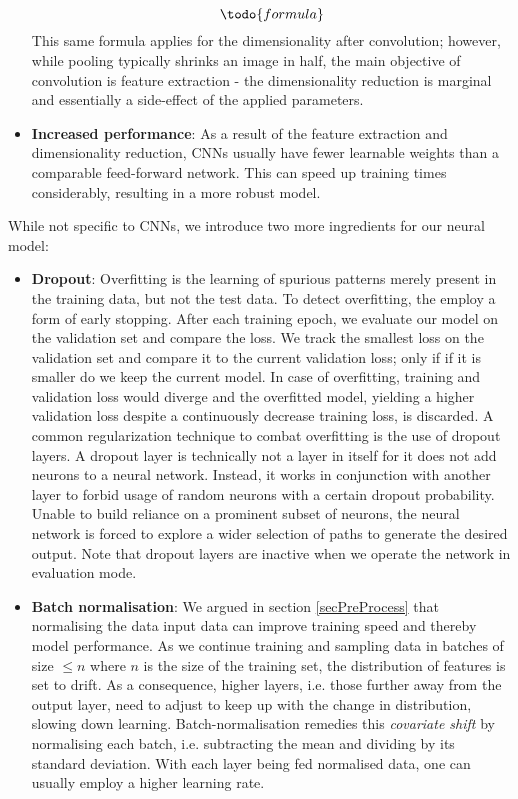 \documentclass[british,12p]{article}
\begin{document}
\begin{itemize}
    	$$\todo{formula}$$
    	This same formula applies for the dimensionality after convolution; however, while pooling typically shrinks an image in half, the main objective of convolution is feature extraction - the dimensionality reduction is marginal and essentially a side-effect of the applied parameters. 
    	\item \textbf{Increased performance}: As a result of the feature extraction and dimensionality reduction, CNNs usually have fewer learnable weights than a comparable feed-forward network. This can speed up training times considerably, resulting in a more robust model.
    \end{itemize}
    
    While not specific to CNNs, we introduce two more ingredients for our neural model:
    \begin{itemize}
        \item \textbf{Dropout}:	Overfitting is the learning of spurious patterns merely present in the training data, but not the test data. To detect overfitting, the employ a form of early stopping. After each training epoch, we evaluate our model on the validation set and compare the loss. We track the smallest loss on the validation set and compare it to the current validation loss; only if if it is smaller do we keep the current model. In case of overfitting, training and validation loss would diverge and the overfitted model, yielding a higher validation loss despite a continuously decrease training loss, is discarded. A common regularization technique to combat overfitting is the use of dropout layers. A dropout layer is technically not a layer in itself for it does not add neurons to a neural network. Instead, it works in conjunction with another layer to forbid usage of random neurons with a certain dropout probability. Unable to build reliance on a prominent subset of neurons, the neural network is forced to explore a wider selection of paths to generate the desired output. Note that dropout layers are inactive when we operate the network in evaluation mode. 
    	\item \textbf{Batch normalisation}: We argued in section \ref{secPreProcess} that normalising the data input data can improve training speed and thereby model performance. As we continue training and sampling data in batches of size $\le n$ where $n$ is the size of the training set, the distribution of features is set to drift. As a consequence, higher layers, i.e. those further away from the output layer, need to adjust to keep up with the change in distribution, slowing down learning. Batch-normalisation remedies this \textit{covariate shift} by normalising each batch, i.e. subtracting the mean and dividing by its standard deviation. With each layer being fed normalised data, one can usually employ a higher learning rate. 
    \end{itemize}
    
\end{document}
